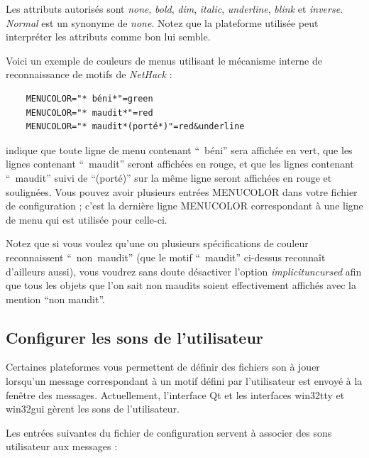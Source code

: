 \documentclass[titlepage]{article}
\begin{document}
Les attributs autorisés sont \textit{none}, \textit{bold}, \textit{dim}, \textit{italic},
\textit{underline}, \textit{blink} et \textit{inverse}.
\textit{Normal} est un synonyme de \textit{none}.
Notez que la plateforme utilisée peut interpréter les attributs comme bon
lui semble.

Voici un exemple de couleurs de menus utilisant le mécanisme interne de
reconnaissance de motifs de \textit{NetHack} :

\begin{verbatim}
    MENUCOLOR="* béni*"=green
    MENUCOLOR="* maudit*"=red
    MENUCOLOR="* maudit*(porté*)"=red&underline
\end{verbatim}

indique que toute ligne de menu contenant ``~béni''
sera affichée en vert, que les lignes contenant ``~maudit'' seront
affichées en rouge, et que les lignes contenant ``~maudit'' suivi de ``(porté)''
sur la même ligne seront affichées en rouge et soulignées.
Vous pouvez avoir plusieurs entrées MENUCOLOR dans votre fichier de configuration ;
c'est la dernière ligne MENUCOLOR correspondant
à une ligne de menu qui est utilisée pour celle-ci.

Notez que si vous voulez qu'une ou plusieurs spécifications de couleur reconnaissent
``~non~maudit'' (que le motif ``~maudit'' ci-dessus reconnaît d'ailleurs
aussi), vous voudrez sans doute désactiver l'option
\textit{implicit\textunderscore uncursed}
afin que tous les objets que l'on sait non maudits soient effectivement
affichés avec la mention ``non maudit''.

\subsection*{Configurer les sons de l'utilisateur}

Certaines plateformes vous permettent de définir des fichiers son à jouer lorsqu'un
message correspondant à un motif défini par l'utilisateur est envoyé à la fenêtre
des messages.
Actuellement, l'interface Qt et les interfaces win32tty et win32gui gèrent
les sons de l'utilisateur.

Les entrées suivantes du fichier de configuration servent à associer des sons
utilisateur aux messages :
\end{document}
